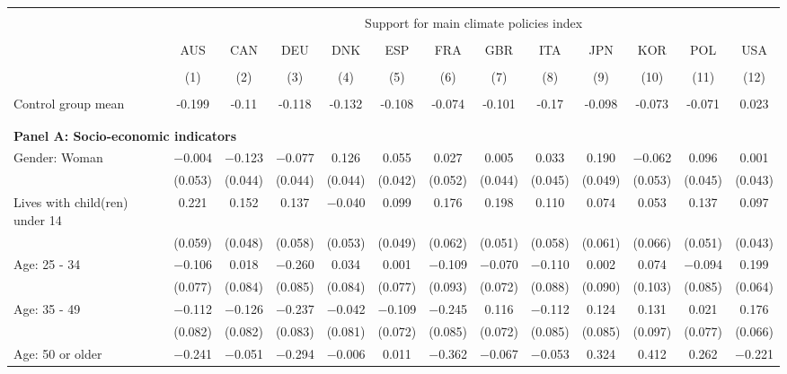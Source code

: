 
\begin{tabular}{@{\extracolsep{5pt}}lcccccccccccc} 
\\[-1.8ex]\hline 
\hline \\[-1.8ex] 
 & \multicolumn{12}{c}{Support for main climate policies index} \\ 
\cline{2-13} 
\\[-1.8ex] & AUS & CAN & DEU & DNK & ESP & FRA & GBR & ITA & JPN & KOR & POL & USA \\ 
\\[-1.8ex] & (1) & (2) & (3) & (4) & (5) & (6) & (7) & (8) & (9) & (10) & (11) & (12)\\ 
\hline \\[-1.8ex] 
Control group mean & -0.199 & -0.11 & -0.118 & -0.132 & -0.108 & -0.074 & -0.101 & -0.17 & -0.098 & -0.073 & -0.071 & 0.023   \\ \hline \\[-1.8ex]
\\[1ex]
\multicolumn{ 13 }{l}{\textbf{ Panel A: Socio-economic indicators }} \\
 Gender: Woman & $-$0.004 & $-$0.123 & $-$0.077 & 0.126 & 0.055 & 0.027 & 0.005 & 0.033 & 0.190 & $-$0.062 & 0.096 & 0.001 \\ 
  & (0.053) & (0.044) & (0.044) & (0.044) & (0.042) & (0.052) & (0.044) & (0.045) & (0.049) & (0.053) & (0.045) & (0.043) \\ 
  Lives with child(ren) under 14 & 0.221 & 0.152 & 0.137 & $-$0.040 & 0.099 & 0.176 & 0.198 & 0.110 & 0.074 & 0.053 & 0.137 & 0.097 \\ 
  & (0.059) & (0.048) & (0.058) & (0.053) & (0.049) & (0.062) & (0.051) & (0.058) & (0.061) & (0.066) & (0.051) & (0.043) \\ 
  Age: 25 - 34 & $-$0.106 & 0.018 & $-$0.260 & 0.034 & 0.001 & $-$0.109 & $-$0.070 & $-$0.110 & 0.002 & 0.074 & $-$0.094 & 0.199 \\ 
  & (0.077) & (0.084) & (0.085) & (0.084) & (0.077) & (0.093) & (0.072) & (0.088) & (0.090) & (0.103) & (0.085) & (0.064) \\ 
  Age: 35 - 49 & $-$0.112 & $-$0.126 & $-$0.237 & $-$0.042 & $-$0.109 & $-$0.245 & 0.116 & $-$0.112 & 0.124 & 0.131 & 0.021 & 0.176 \\ 
  & (0.082) & (0.082) & (0.083) & (0.081) & (0.072) & (0.085) & (0.072) & (0.085) & (0.085) & (0.097) & (0.077) & (0.066) \\ 
  Age: 50 or older & $-$0.241 & $-$0.051 & $-$0.294 & $-$0.006 & 0.011 & $-$0.362 & $-$0.067 & $-$0.053 & 0.324 & 0.412 & 0.262 & $-$0.221 \\ 

\end{tabular}
